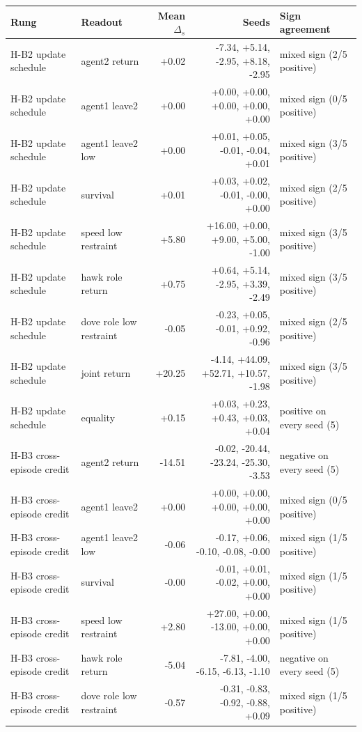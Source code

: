 \begin{tabular}{llrrl}
\toprule
Rung & Readout & Mean $\Delta_s$ & Seeds & Sign agreement \\
\midrule
H-B2 update schedule & agent2 return & +0.02 & -7.34, +5.14, -2.95, +8.18, -2.95 & mixed sign (2/5 positive) \\
H-B2 update schedule & agent1 leave2 & +0.00 & +0.00, +0.00, +0.00, +0.00, +0.00 & mixed sign (0/5 positive) \\
H-B2 update schedule & agent1 leave2 low & +0.00 & +0.01, +0.05, -0.01, -0.04, +0.01 & mixed sign (3/5 positive) \\
H-B2 update schedule & survival & +0.01 & +0.03, +0.02, -0.01, -0.00, +0.00 & mixed sign (2/5 positive) \\
H-B2 update schedule & speed low restraint & +5.80 & +16.00, +0.00, +9.00, +5.00, -1.00 & mixed sign (3/5 positive) \\
H-B2 update schedule & hawk role return & +0.75 & +0.64, +5.14, -2.95, +3.39, -2.49 & mixed sign (3/5 positive) \\
H-B2 update schedule & dove role low restraint & -0.05 & -0.23, +0.05, -0.01, +0.92, -0.96 & mixed sign (2/5 positive) \\
H-B2 update schedule & joint return & +20.25 & -4.14, +44.09, +52.71, +10.57, -1.98 & mixed sign (3/5 positive) \\
H-B2 update schedule & equality & +0.15 & +0.03, +0.23, +0.43, +0.03, +0.04 & positive on every seed (5) \\
H-B3 cross-episode credit & agent2 return & -14.51 & -0.02, -20.44, -23.24, -25.30, -3.53 & negative on every seed (5) \\
H-B3 cross-episode credit & agent1 leave2 & +0.00 & +0.00, +0.00, +0.00, +0.00, +0.00 & mixed sign (0/5 positive) \\
H-B3 cross-episode credit & agent1 leave2 low & -0.06 & -0.17, +0.06, -0.10, -0.08, -0.00 & mixed sign (1/5 positive) \\
H-B3 cross-episode credit & survival & -0.00 & -0.01, +0.01, -0.02, +0.00, +0.00 & mixed sign (1/5 positive) \\
H-B3 cross-episode credit & speed low restraint & +2.80 & +27.00, +0.00, -13.00, +0.00, +0.00 & mixed sign (1/5 positive) \\
H-B3 cross-episode credit & hawk role return & -5.04 & -7.81, -4.00, -6.15, -6.13, -1.10 & negative on every seed (5) \\
H-B3 cross-episode credit & dove role low restraint & -0.57 & -0.31, -0.83, -0.92, -0.88, +0.09 & mixed sign (1/5 positive) \\

\end{tabular}
